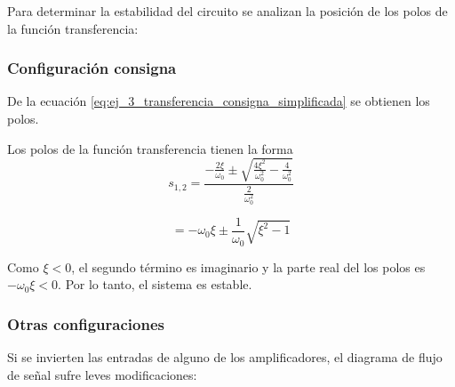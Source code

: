 \documentclass[../../main.tex]{subfiles}
\begin{document}
Para determinar la estabilidad del circuito se analizan la posici\'on de los polos de la funci\'on transferencia:

\subsubsection{Configuraci\'on consigna} \label{ssec:ej_3_estabilidad_consigna}
De la ecuaci\'on \ref{eq:ej_3_transferencia_consigna_simplificada} se obtienen los polos.

Los polos de la funci\'on transferencia tienen la forma 
\[s_{1,2} = \frac{-\frac{2\xi}{\omega_0}\pm\sqrt{\frac{4\xi^2}{\omega_0^2}-\frac{4}{\omega_0^2}}}{\frac{2}{\omega_0^2}}\]

\[=-\omega_0\xi \pm \frac{1}{\omega_0}\sqrt{\xi^2-1}\]

Como $\xi<0$, el segundo t\'ermino es imaginario y la parte real del los polos es $-\omega_0\xi<0$. Por lo tanto, el sistema es estable.


\subsubsection{Otras configuraciones}

Si se invierten las entradas de alguno de los amplificadores, el diagrama de flujo de se\~nal sufre leves modificaciones:
\end{document}
